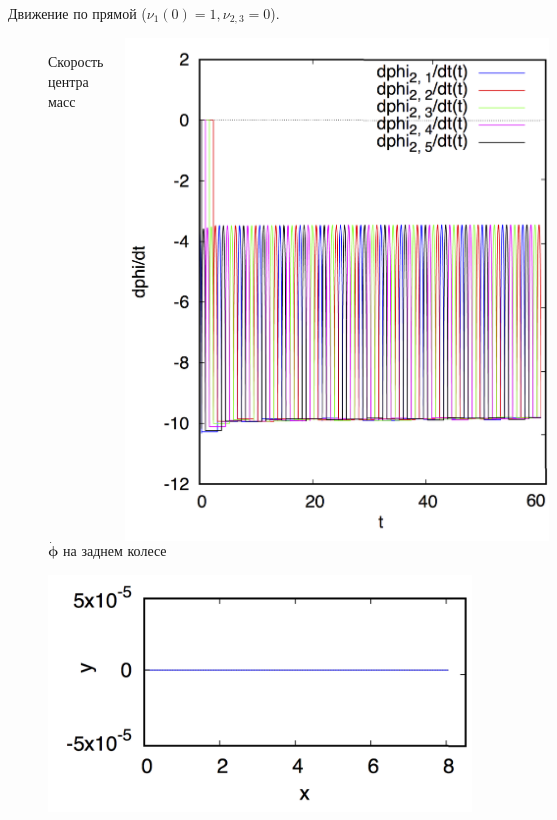 \begin{frame}{Движение по прямой ($\nu_1(0) = 1, \nu_{2,3} = 0$).}
\begin{figure}[H]
\begin{columns}
                \vspace{-15pt}
                \caption{Скорость центра масс}
                \centering
                \vspace{2.5pt}
                \includegraphics[width=0.8\linewidth]{content/pic/straight_60/nus2.png}
                \vspace{-15pt}
                \caption{$\dot{\mathbf{\phi}}$ на заднем колесе}
        \end{columns}
    \end{figure}
    \vspace{-25pt}
    \begin{figure}[H]
        \centering
        \begin{columns}
                \centering
                \includegraphics[width=\linewidth]{content/pic/straight_60/traj.png}

\end{columns}
\end{figure}
\end{frame}

